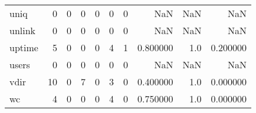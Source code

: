 \begin{longtable}{lrrrrrrrrr}
uniq      &                                                  0 &                                                  0 &                                                  0 &                                                  0 &                                                  0 &                                                  0 &                                                NaN &                                    NaN &                                  NaN \\
unlink    &                                                  0 &                                                  0 &                                                  0 &                                                  0 &                                                  0 &                                                  0 &                                                NaN &                                    NaN &                                  NaN \\
uptime    &                                                  5 &                                                  0 &                                                  0 &                                                  0 &                                                  4 &                                                  1 &                                           0.800000 &                                    1.0 &                             0.200000 \\
users     &                                                  0 &                                                  0 &                                                  0 &                                                  0 &                                                  0 &                                                  0 &                                                NaN &                                    NaN &                                  NaN \\
vdir      &                                                 10 &                                                  0 &                                                  7 &                                                  0 &                                                  3 &                                                  0 &                                           0.400000 &                                    1.0 &                             0.000000 \\
wc        &                                                  4 &                                                  0 &                                                  0 &                                                  0 &                                                  4 &                                                  0 &                                           0.750000 &                                    1.0 &                             0.000000 \\

\end{longtable}

